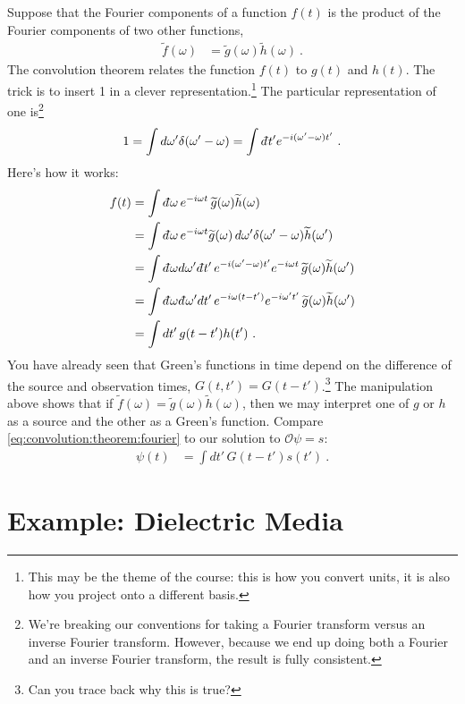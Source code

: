 Suppose that the Fourier components of a function $f(t)$ is the product of the Fourier components of two other functions,
\begin{align}
	\tilde f(\omega) &= \tilde g(\omega) \tilde h(\omega) \ .
\end{align}
The convolution theorem relates the function $f(t)$ to $g(t)$ and $h(t)$. The trick is to insert 1 in a clever representation.\footnote{This may be the theme of the course: this is how you convert units, it is also how you project onto a different basis.} The particular representation of one is\footnote{We're breaking our conventions for taking a Fourier transform versus an inverse Fourier transform. However, because we end up doing both a Fourier and an inverse Fourier transform, the result is fully consistent.} 
\begin{align}
	1
	=\int d\omega' \delta(\omega'-\omega) 
	= \int \dbar t' e^{-i(\omega'-\omega)t'} \ .
\end{align}
Here's how it works:
\begin{align}
	f(t) &= \int \dbar \omega \, e^{-i\omega t}\, \tilde g(\omega) \tilde h(\omega)
	\\ 
	&= \int \dbar \omega  \, e^{-i\omega t} \tilde g(\omega)\, d\omega' \delta(\omega'-\omega) \tilde h(\omega')
	\\ 
	&= \int \dbar \omega d\omega' \dbar t'  \, e^{-i(\omega'-\omega)t'}e^{-i\omega t}\,  \tilde g(\omega)\tilde h(\omega')
	\\ 
	&= \int \dbar \omega  \dbar\omega' d t'  \, e^{-i\omega(t-t')}e^{-i\omega' t'}\,  \tilde g(\omega)\tilde h(\omega')
	\\ 
	&= \int dt'  \, g(t-t') h(t') \ .
	\label{eq:convolution:theorem:fourier}
\end{align}
You have already seen that Green's functions in time depend on the difference of the source and observation times, $G(t,t') = G(t-t')$.\footnote{Can you trace back why this is true?} The manipulation above shows that if $\tilde f(\omega) = \tilde g(\omega)\tilde h(\omega)$, then we may interpret one of $g$ or $h$ as a source and the other as a Green's function. Compare \eqref{eq:convolution:theorem:fourier} to our solution to $\mathcal O\psi = s$:
\begin{align}
	\psi(t) &= \int dt' \, G(t-t') s(t') \ .
\end{align}



\section{Example: Dielectric Media}


